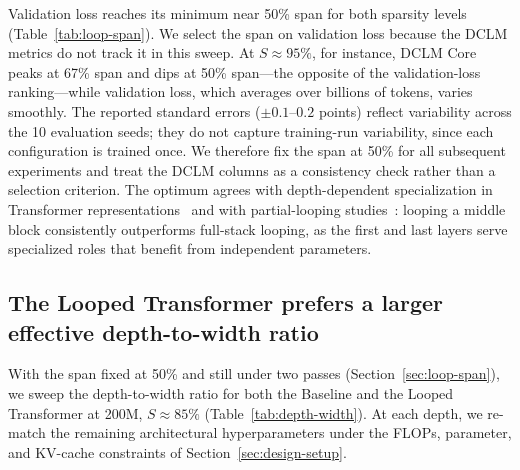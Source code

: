 \documentclass[]{bytedance_seed}
\theoremstyle{definition}
\theoremstyle{remark}
\begin{document}
Validation loss reaches its minimum near 50\% span for both sparsity levels (Table~\ref{tab:loop-span}).
%
We select the span on validation loss because the DCLM metrics do not track it in this sweep.
%
At $S \approx 95\%$, for instance, DCLM Core peaks at 67\% span and dips at 50\% span---the opposite of the validation-loss ranking---while validation loss, which averages over billions of tokens, varies smoothly.
%
The reported standard errors ($\pm0.1$--$0.2$ points) reflect variability across the 10 evaluation seeds; they do not capture training-run variability, since each configuration is trained once.
%
We therefore fix the span at 50\% for all subsequent experiments and treat the DCLM columns as a consistency check rather than a selection criterion.
%
The optimum agrees with depth-dependent specialization in Transformer representations~\cite{lad2024remarkable,tenney2019bert} and with partial-looping studies~\cite{saunshi2025reasoning,kapl2026growing,cai2026t2mlr}: looping a middle block consistently outperforms full-stack looping, as the first and last layers serve specialized roles that benefit from independent parameters.
%

\subsection{The Looped Transformer prefers a larger effective depth-to-width ratio}
\label{sec:depth-vs-width}

With the span fixed at 50\% and still under two passes (Section~\ref{sec:loop-span}), we sweep the depth-to-width ratio for both the Baseline and the Looped Transformer at 200M, $S \approx 85\%$ (Table~\ref{tab:depth-width}).
%
At each depth, we re-match the remaining architectural hyperparameters under the FLOPs, parameter, and KV-cache constraints of Section~\ref{sec:design-setup}.
%
\end{document}
